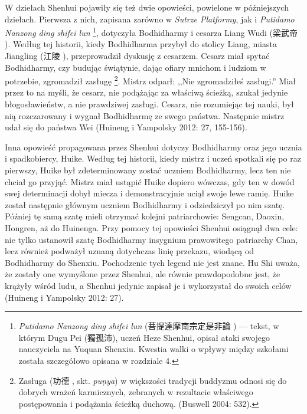 W dziełach Shenhui pojawiły się też dwie opowieści, powielone w późniejszych dziełach. Pierwsza z nich, zapisana zarówno w \textit{Sutrze Platformy}, jak i \textit{Putidamo Nanzong ding shifei lun}%
\footnote{\textit{Putidamo Nanzong ding shifei lun} (菩提達摩南宗定是非論 ) --- tekst, w którym Dugu Pei (獨孤沛), uczeń Heze Shenhui, opisał ataki swojego nauczyciela na Yuquan Shenxiu. Kwestia walki o wpływy między szkołami została szczegółowo opisana w rozdziale 4.}, dotyczyła Bodhidharmy i cesarza Liang Wudi (梁武帝 ).
Według tej historii, kiedy Bodhidharma przybył do stolicy Liang, miasta Jiangling (江陵 ), przeprowadził dyskusję z cesarzem. Cesarz miał spytać Bodhidharmy, czy budując świątynie, dając ofiary mnichom i ludziom w potrzebie, zgromadził zasługę%
\footnote{Zasługa (功德 , skt. \textit{pu\d{n}ya}) w większości tradycji buddyzmu odnosi się do dobrych wrażeń karmicznych, zebranych w rezultacie właściwego postępowania i podążania ścieżką duchową. (Buswell 2004: 532).}.
Mistrz odparł: ,,Nie zgromadziłeś zasługi.'' Miał przez to na myśli, że cesarz, nie podążając za właściwą ścieżką, szukał jedynie błogosławieństw, a nie prawdziwej zasługi. Cesarz, nie rozumiejąc tej nauki, był nią rozczarowany i wygnał Bodhidharmę ze swego państwa. Następnie mistrz udał się do\label{LiangWuDi} państwa Wei %
(Huineng i Yampolsky 2012: 27, 155-156).


Inna opowieść propagowana przez Shenhui dotyczy Bodhidharmy oraz jego ucznia i spadkobiercy, Huike. Według tej historii, kiedy mistrz i uczeń spotkali się po raz pierwszy, Huike był zdeterminowany zostać uczniem Bodhidharmy, lecz ten nie chciał go przyjąć. Mistrz miał ustąpić Huike dopiero wówczas, gdy ten w dowód swej determinacji dobył miecza i demonstracyjnie uciął swoje lewe ramię. Huike został następnie głównym uczniem Bodhidharmy i odziedziczył po nim szatę. Później tę samą szatę mieli otrzymać kolejni patriarchowie: Sengcan, Daoxin, Hongren, aż do Huinenga. Przy pomocy tej opowieści Shenhui osiągnął dwa cele: nie tylko ustanowił szatę Bodhidharmy insygnium prawowitego patriarchy Chan, lecz również podważył uznaną dotychczas linię przekazu, wiodącą od Bodhidharmy do Shenxiu. Pochodzenie tych legend nie jest znane. Hu Shi uważa, że zostały one wymyślone przez Shenhui, ale równie prawdopodobne jest, że krążyły wśród ludu, a Shenhui jedynie zapisał je i wykorzystał do swoich celów (Huineng i Yampolsky 2012: 27).

